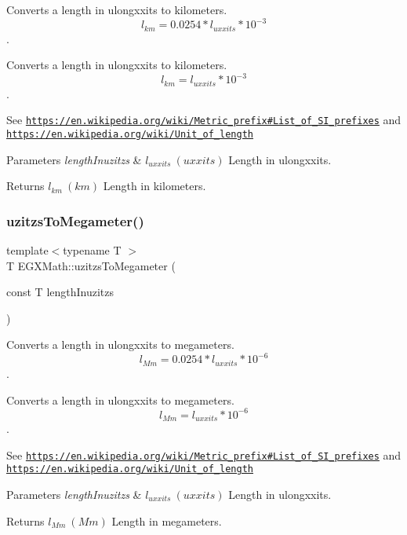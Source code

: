Converts a length in ulongxxits to kilometers. \[ l_{km}=0.0254 * l_{uxxits} * 10^{-3} \]. 

Converts a length in ulongxxits to kilometers. \[ l_{km}=l_{uxxits} * 10^{-3} \].

See \href{https://en.wikipedia.org/wiki/Metric_prefix#List_of_SI_prefixes}{\tt https\+://en.\+wikipedia.\+org/wiki/\+Metric\+\_\+prefix\#\+List\+\_\+of\+\_\+\+S\+I\+\_\+prefixes} and \href{https://en.wikipedia.org/wiki/Unit_of_length}{\tt https\+://en.\+wikipedia.\+org/wiki/\+Unit\+\_\+of\+\_\+length} 
\begin{DoxyParams}{Parameters}
{\em length\+Inuzitzs} & $ l_{uxxits}\ (uxxits)$ Length in ulongxxits. \\
\hline
\end{DoxyParams}
\begin{DoxyReturn}{Returns}
$ l_{km}\ (km)$ Length in kilometers. 
\end{DoxyReturn}
\mbox{\label{group___e_g_x_math-_conversions-_length_conversions-_imperial-uzitzs-_s_i_ga237ffeef9137de3dd2cf5ae0eacf973e}} 
\subsubsection{\texorpdfstring{uzitzs\+To\+Megameter()}{uzitzsToMegameter()}}
{\footnotesize\ttfamily template$<$typename T $>$ \\
T E\+G\+X\+Math\+::uzitzs\+To\+Megameter (\begin{DoxyParamCaption}\item[{const T}]{length\+Inuzitzs }\end{DoxyParamCaption})}



Converts a length in ulongxxits to megameters. \[ l_{Mm}=0.0254 * l_{uxxits} * 10^{-6} \]. 

Converts a length in ulongxxits to megameters. \[ l_{Mm}=l_{uxxits} * 10^{-6} \].

See \href{https://en.wikipedia.org/wiki/Metric_prefix#List_of_SI_prefixes}{\tt https\+://en.\+wikipedia.\+org/wiki/\+Metric\+\_\+prefix\#\+List\+\_\+of\+\_\+\+S\+I\+\_\+prefixes} and \href{https://en.wikipedia.org/wiki/Unit_of_length}{\tt https\+://en.\+wikipedia.\+org/wiki/\+Unit\+\_\+of\+\_\+length} 
\begin{DoxyParams}{Parameters}
{\em length\+Inuzitzs} & $ l_{uxxits}\ (uxxits)$ Length in ulongxxits. \\
\hline
\end{DoxyParams}
\begin{DoxyReturn}{Returns}
$ l_{Mm}\ (Mm)$ Length in megameters. 
\end{DoxyReturn}
\mbox{\label{group___e_g_x_math-_conversions-_length_conversions-_imperial-uzitzs-_s_i_gad256d80aa1424b503ded3fda023ee4dd}} 
